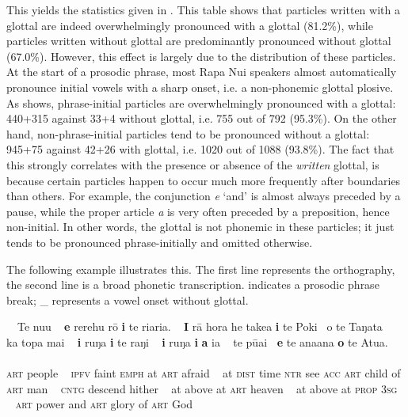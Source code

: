 This yields the statistics given in . This table shows that particles written with a glottal are indeed overwhelmingly pronounced with a glottal (81.2\%), while particles written without glottal are predominantly pronounced without glottal (67.0\%). However, this effect is largely due to the distribution of these particles. At the start of a prosodic phrase, most Rapa Nui speakers almost automatically pronounce initial vowels with a sharp onset, i.e. a non-phonemic glottal plosive. As  shows, phrase-initial particles are overwhelmingly pronounced with a glottal: 440+315 against 33+4 without glottal, i.e. 755 out of 792 (95.3\%). On the other hand, non-phrase-initial particles tend to be pronounced without a glottal: 945+75 against 42+26 with glottal, i.e. 1020 out of 1088 (93.8\%). The fact that this strongly correlates with the presence or absence of the \textit{written} glottal, is because certain particles happen to occur much more frequently after boundaries than others. For example, the conjunction \textit{{\ꞌ}e} ‘and’ is almost always preceded by a pause, while the proper article \textit{a} is very often preceded by a preposition, hence non-initial. In other words, the glottal is not phonemic in these particles; it just tends to be pronounced phrase-initially and omitted otherwise.

The following example illustrates this. The first line represents the orthography, the second line is a broad phonetic transcription. {\textbar} indicates a prosodic phrase break; \_  represents a vowel onset without glottal.

\ea\label{ex:2.1}
\glll  ~~Te nu{\ꞌ}u ~ \textbf{e} rerehu rō \textbf{{\ꞌ}i} te ri{\ꞌ}ari{\ꞌ}a. ~ \textbf{{\ꞌ}I} rā hora he take{\ꞌ}a \textbf{i} te Poki ~o te Taŋata ~ ka topa mai ~  \textbf{{\ꞌ}i} ruŋa \textbf{i} te raŋi ~ \textbf{{\ꞌ}i} ruŋa \textbf{i} \textbf{a} ia  ~ te pūai \textbf{~{\ꞌ}e} te {\ꞌ}ana{\ꞌ}ana \textbf{o} te {\ꞌ}Atua.\\
[~te nuʔu {\textbar} \textbf{ʔe} rerehu roː \textbf{\_i} te riʔariʔa {\textbar} \textbf{ʔi} raː hora he takea \textbf{\_i} te poki \textbf{\_o} te taŋata {\textbar} ka topa mai {\textbar} \textbf{ʔi} ruŋa \textbf{\_i} te raŋi {\textbar} \textbf{ʔi} ruŋa \textbf{\_i} \textbf{\_a} ia {\textbar} te puːai \textbf{ʔe} te ʔanaʔana \textbf{\_o} te ʔatua~]\\
\textsc{art} people ~ \textsc{ipfv} faint \textsc{emph} at \textsc{art} afraid  ~  at \textsc{dist} time \textsc{ntr} see \textsc{acc} \textsc{art} child of \textsc{art} man  ~  \textsc{cntg} descend hither  ~  at above at \textsc{art} heaven  ~  at above at \textsc{prop} \textsc{3sg}  ~  \textsc{art} power and \textsc{art} glory of \textsc{art} God\\

